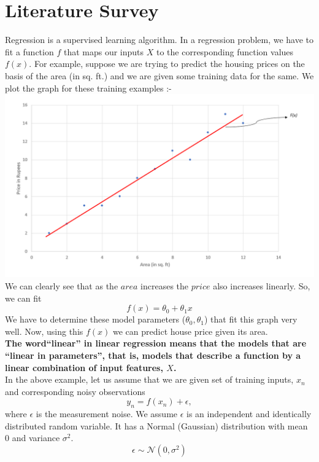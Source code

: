 \documentclass[12pt]{article}
\numberwithin{equation}{section}
\begin{document}
\section{Literature Survey}\label{literature}
Regression is a supervised learning algorithm. In a regression problem, we have to fit a function $f$ that maps our inputs $X$ to the corresponding function values $f(x)$. For example,  suppose we are trying to predict the housing prices on the basis of the area (in sq. ft.) and we are given some training data for the same. We plot the graph for these training examples :- \\
\includegraphics[width=\textwidth]{graph1}\\
We can clearly see that as the $area$ increases the $price$ also increases linearly. So, we can fit 
\begin{equation*}
	f(x)=\theta_{0} + \theta_{1}x
\end{equation*}
We have to determine these model parameters ($\theta_{0},\theta_{1}$) that fit this graph very well. Now, using this $f(x)$ we can predict house price given its area.\\
\textbf{The word``linear'' in linear regression means that the models that are ``linear in parameters'', that is, models that describe a function by a linear combination of input features, $X$.}\\
In the above example, let us assume that we are given set of training inputs, $x_{n}$ and corresponding noisy observations
$$y_{n}= f(x_{n}) + \epsilon,$$ 
where $\epsilon$ is the measurement noise. We assume $\epsilon$ is an independent and identically distributed random variable. It has a Normal (Gaussian) distribution with mean 0 and variance $\sigma^2$.
\begin{equation*}
	\epsilon \sim \mathcal{N}(0,\sigma^2)
\end{equation*}
\end{document}
